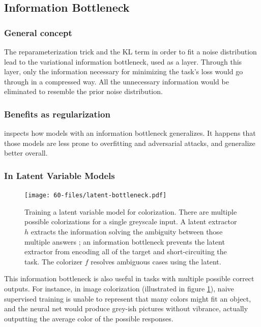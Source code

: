 \subsection{Information Bottleneck}

\subsubsection{General concept}

The reparameterization trick and the KL term in order to fit a noise distribution lead to the variational information bottleneck, used as a layer. Through this layer, only the information necessary for minimizing the task's loss would go through in a compressed way. All the unnecessary information would be eliminated to resemble the prior noise distribution.

\subsubsection{Benefits as regularization}

\citet{informationbottleneck} inspects how models with an information bottleneck generalizes. It happens that those models are less prone to overfitting and adversarial attacks, and generalize better overall.

\subsubsection{In Latent Variable Models}
\label{sec:lvm}
\begin{figure}[ht]
    \centering
    \texttt{[image: 60-files/latent-bottleneck.pdf]}
    \caption{Training a latent variable model for colorization. There are multiple possible colorizations for a single greyscale input. A latent extractor $h$ extracts the information solving the ambiguity between those multiple answers ; an information bottleneck prevents the latent extractor from encoding all of the target and short-circuiting the task. The colorizer $f$ resolves ambiguous cases using the latent.}
    \label{fig:latent-bottleneck}
\end{figure}

This information bottleneck is also useful in tasks with multiple possible correct outputs. For instance, in image colorization (illustrated in figure \ref{fig:latent-bottleneck}), naive supervised training is unable to represent that many colors might fit an object, and the neural net would produce grey-ish pictures without vibrance, actually outputting the average color of the possible responses.




